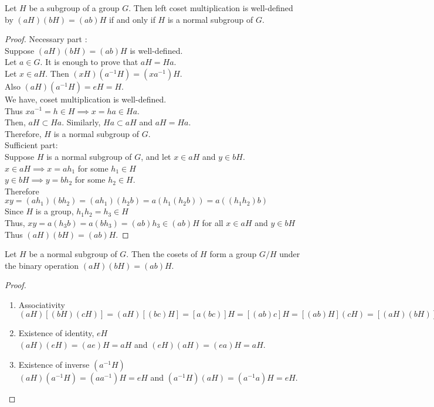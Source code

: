 \begin{theorem}
	Let $H$ be a subgroup of a group $G$. Then left coset multiplication is well-defined by $(aH)(bH) = (ab)H$ if and only if $H$ is a normal subgroup of $G$.
\end{theorem}
\begin{proof}
	Necessary part :\\
	Suppose $(aH)(bH) = (ab)H$ is well-defined.\\
	Let $a \in G$. It is enough to prove that $aH = Ha$.\\
	Let $x \in aH$. Then $(xH)(a^{-1}H) = (xa^{-1})H$.\\
	Also $(aH)(a^{-1}H) = eH = H$.\\
	We have, coset multiplication is well-defined.\\
	Thus $xa^{-1} = h \in H \implies x = ha \in Ha$.\\
	Then, $aH \subset Ha$. Similarly, $Ha \subset aH$ and $aH = Ha$.\\
	Therefore, $H$ is a normal subgroup of $G$.\\

	Sufficient part:\\
	Suppose $H$ is a normal subgroup of $G$, and let $x \in aH$ and $y \in bH$.\\
	$x \in aH \implies x = ah_1$ for some $h_1 \in H$\\
	$y \in bH \implies y = bh_2$ for some $h_2 \in H$.\\
	Therefore $xy = (ah_1)(bh_2) = (ah_1)(h_2b) = a(h_1(h_2b)) = a((h_1h_2)b)$\\
	Since $H$ is a group, $h_1h_2 = h_3 \in H$\\
	Thus, $xy = a(h_3b) = a(bh_3) = (ab)h_3 \in (ab)H$ for all $x \in aH$ and $y \in bH$\\
	Thus $(aH)(bH) = (ab)H$.
\end{proof}

\begin{corollary}
	Let $H$ be a normal subgroup of $G$. Then the cosets of $H$ form a group $G/H$ under the binary operation $(aH)(bH) = (ab)H$.
\end{corollary}
\begin{proof}
	\begin{enumerate}[label=G\arabic*]
		\item Associativity\\
			$(aH)[(bH)(cH)] = (aH)[(bc)H] = [a(bc)]H = [(ab)c]H = [(ab)H](cH) = [(aH)(bH)](cH)$
		\item Existence of identity, $eH$\\
			$(aH)(eH) = (ae)H = aH$ and $(eH)(aH) = (ea)H = aH$.
		\item Existence of inverse $(a^{-1}H)$\\
			$(aH)(a^{-1}H) = (aa^{-1})H = eH$ and $(a^{-1}H)(aH) = (a^{-1}a)H = eH$.
	\end{enumerate}
\end{proof}


